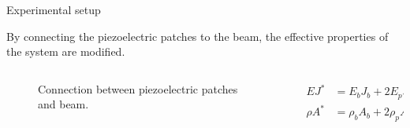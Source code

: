 \begin{frame}{Experimental setup}

    By connecting the piezoelectric patches to the beam, the effective properties of the system are modified.

    \vspace{9pt}

    \begin{columns}[c, onlytextwidth]

        \begin{column}{0.6\textwidth}

            \begin{figure}[H]

                \centering


                \caption{Connection between piezoelectric patches and beam.}

            \end{figure}

        \end{column}

        \begin{column}{0.4\textwidth}

            \begin{equation}
                \begin{aligned}
                    EJ^*     & = E_b J_b + 2 E_p J_p       \\
                    \rho A^* & = \rho_b A_b + 2 \rho_p A_p
                \end{aligned}
            \end{equation}

        \end{column}

    \end{columns}

\end{frame}